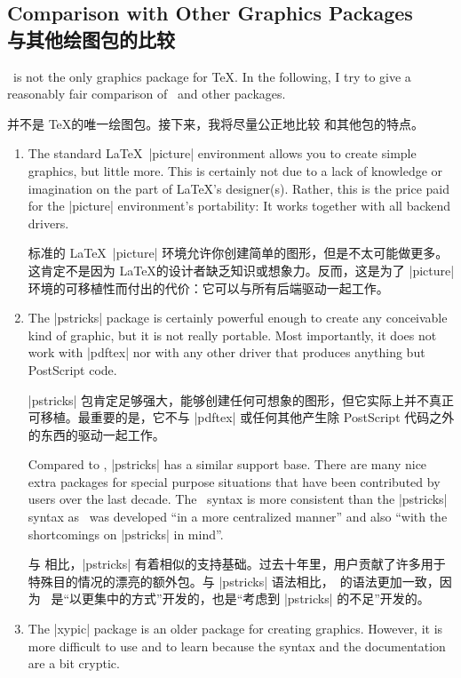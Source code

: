 


\subsection{Comparison with Other Graphics Packages\\与其他绘图包的比较}

\tikzname\ is not the only graphics package for \TeX. In the following, I try
to give a reasonably fair comparison of \tikzname\ and other packages.
%

\tikzname 并不是 \TeX 的唯一绘图包。接下来，我将尽量公正地比较 \tikzname 和其他包的特点。

\begin{enumerate}
    \item The standard \LaTeX\ |{picture}| environment allows you to create
        simple graphics, but little more. This is certainly not due to a lack
        of knowledge or imagination on the part of \LaTeX's designer(s).
        Rather, this is the price paid for the |{picture}| environment's
        portability: It works together with all backend drivers.

        标准的 \LaTeX\ |{picture}| 环境允许你创建简单的图形，但是不太可能做更多。这肯定不是因为 \LaTeX 的设计者缺乏知识或想象力。反而，这是为了 |{picture}| 环境的可移植性而付出的代价：它可以与所有后端驱动一起工作。
    \item The |pstricks| package is certainly powerful enough to create any
        conceivable kind of graphic, but it is not really portable. Most
        importantly, it does not work with |pdftex| nor with any other driver
        that produces anything but PostScript code.

        |pstricks| 包肯定足够强大，能够创建任何可想象的图形，但它实际上并不真正可移植。最重要的是，它不与 |pdftex| 或任何其他产生除 PostScript 代码之外的东西的驱动一起工作。

        Compared to \tikzname, |pstricks| has a similar support base. There
        are many nice extra packages for special purpose situations that have
        been contributed by users over the last decade. The \tikzname\ syntax
        is more consistent than the |pstricks| syntax as \tikzname\ was
        developed ``in a more centralized manner'' and also ``with the
        shortcomings on |pstricks| in mind''.

        与 \tikzname 相比，|pstricks| 有着相似的支持基础。过去十年里，用户贡献了许多用于特殊目的情况的漂亮的额外包。与 |pstricks| 语法相比，\tikzname\ 的语法更加一致，因为 \tikzname\ 是“以更集中的方式”开发的，也是“考虑到 |pstricks| 的不足”开发的。
    \item The |xypic| package is an older package for creating graphics.
        However, it is more difficult to use and to learn because the syntax
        and the documentation are a bit cryptic.


\end{enumerate}

